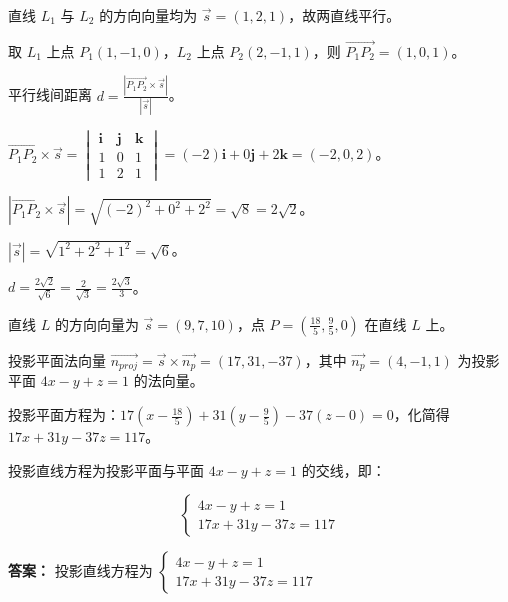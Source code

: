 \begin{solution}

直线 \(L_1\) 与 \(L_2\) 的方向向量均为 \( \vec{s} = (1, 2, 1) \)，故两直线平行。

取 \(L_1\) 上点 \(P_1(1, -1, 0)\)，\(L_2\) 上点 \(P_2(2, -1, 1)\)，则 \( \overrightarrow{P_1P_2} = (1, 0, 1) \)。

平行线间距离 \( d = \frac{|\overrightarrow{P_1P_2} \times \vec{s}|}{|\vec{s}|} \)。

\( \overrightarrow{P_1P_2} \times \vec{s} = \begin{vmatrix} \mathbf{i} & \mathbf{j} & \mathbf{k} \\ 1 & 0 & 1 \\ 1 & 2 & 1 \end{vmatrix} = (-2)\mathbf{i} + 0\mathbf{j} + 2\mathbf{k} = (-2, 0, 2) \)。

\( |\overrightarrow{P_1P_2} \times \vec{s}| = \sqrt{(-2)^2 + 0^2 + 2^2} = \sqrt{8} = 2\sqrt{2} \)。

\( |\vec{s}| = \sqrt{1^2 + 2^2 + 1^2} = \sqrt{6} \)。

\( d = \frac{2\sqrt{2}}{\sqrt{6}} = \frac{2}{\sqrt{3}} = \frac{2\sqrt{3}}{3} \)。
\end{solution}

\begin{solution}

直线 \(L\) 的方向向量为 \( \vec{s} = (9, 7, 10) \)，点 \( P = (\frac{18}{5}, \frac{9}{5}, 0) \) 在直线 \(L\) 上。

投影平面法向量 \( \vec{n_{proj}} = \vec{s} \times \vec{n_p} = (17, 31, -37) \)，其中 \( \vec{n_p} = (4, -1, 1) \) 为投影平面 \( 4x - y + z = 1 \) 的法向量。

投影平面方程为：\( 17(x - \frac{18}{5}) + 31(y - \frac{9}{5}) - 37(z - 0) = 0 \)，化简得 \( 17x + 31y - 37z = 117 \)。

投影直线方程为投影平面与平面 \( 4x - y + z = 1 \) 的交线，即：

\[
\begin{cases}
4x - y + z = 1 \\
17x + 31y - 37z = 117
\end{cases}
\]

\textbf{答案：} 投影直线方程为 \( \begin{cases} 4x - y + z = 1 \\ 17x + 31y - 37z = 117 \end{cases} \)
    
\end{solution}

